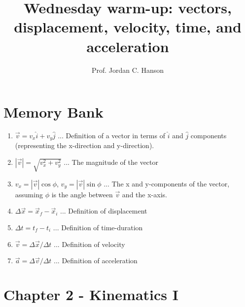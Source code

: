 \documentclass{article}
\begin{document}
\twocolumn

\title{Wednesday warm-up: vectors, displacement, velocity, time, and acceleration}
\author{Prof. Jordan C. Hanson}

\maketitle

\section{Memory Bank}

\begin{enumerate}
\item $\vec{v} = v_x \hat{i} + v_y \hat{j}$ ... Definition of a vector in terms of $\hat{i}$ and $\hat{j}$ components (representing the x-direction and y-direction).
\item $|\vec{v}| = \sqrt{v_x^2 + v_y^2}$ ... The magnitude of the vector
\item $v_x = |\vec{v}| \cos\phi$, $v_y = |\vec{v}| \sin\phi$ ... The x and y-components of the vector, assuming $\phi$ is the angle between $\vec{v}$ and the x-axis.
\item $\Delta \vec{x} = \vec{x}_f - \vec{x}_i$ ... Definition of displacement
\item $\Delta t = t_f - t_i$ ... Definition of time-duration
\item $\vec{v} = \Delta \vec{x}/\Delta t$ ... Definition of velocity
\item $\vec{a} = \Delta \vec{v}/\Delta t$ ... Definition of acceleration
\end{enumerate}

\section{Chapter 2 - Kinematics I}
\end{document}
